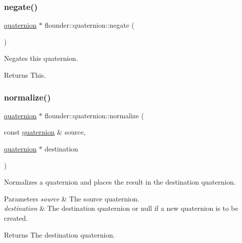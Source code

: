 \subsubsection{\texorpdfstring{negate()}{negate()}\hspace{0.1cm}{\footnotesize\ttfamily [2/2]}}
{\footnotesize\ttfamily \hyperlink{classflounder_1_1quaternion}{quaternion} $\ast$ flounder\+::quaternion\+::negate (\begin{DoxyParamCaption}{ }\end{DoxyParamCaption})}



Negates this quaternion. 

\begin{DoxyReturn}{Returns}
This. 
\end{DoxyReturn}
\mbox{\label{classflounder_1_1quaternion_ae5092edec94adfdd43add8f3825072fe}} 
\subsubsection{\texorpdfstring{normalize()}{normalize()}\hspace{0.1cm}{\footnotesize\ttfamily [1/2]}}
{\footnotesize\ttfamily \hyperlink{classflounder_1_1quaternion}{quaternion} $\ast$ flounder\+::quaternion\+::normalize (\begin{DoxyParamCaption}\item[{const \hyperlink{classflounder_1_1quaternion}{quaternion} \&}]{source,  }\item[{\hyperlink{classflounder_1_1quaternion}{quaternion} $\ast$}]{destination }\end{DoxyParamCaption})\hspace{0.3cm}{\ttfamily [static]}}



Normalizes a quaternion and places the result in the destination quaternion. 


\begin{DoxyParams}{Parameters}
{\em source} & The source quaternion. \\
\hline
{\em destination} & The destination quaternion or null if a new quaternion is to be created.\\
\hline
\end{DoxyParams}
\begin{DoxyReturn}{Returns}
The destination quaternion. 
\end{DoxyReturn}
\mbox{\label{classflounder_1_1quaternion_a01318feb0c32b259ee5325db9f78fe7e}} 

